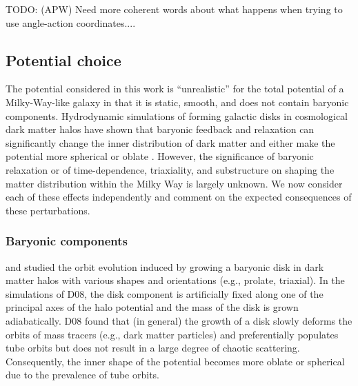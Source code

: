 \documentclass[letterpaper,12pt,preprint]{aastex}
\newcommand{\todo}[2]{{\color{red} TODO: (\MakeUppercase{#1}) #2}}
\begin{document}
\todo{apw}{Need more coherent words about what happens when trying to use angle-action coordinates...}.

\subsection{Potential choice}

The potential considered in this work is ``unrealistic'' for the total potential of a Milky-Way-like galaxy in that it is static, smooth, and does not contain baryonic components. Hydrodynamic simulations of forming galactic disks in cosmological dark matter halos have shown that baryonic feedback and relaxation can significantly change the inner distribution of dark matter and either make the potential more spherical or oblate \citep{many}. However, the significance of baryonic relaxation or of time-dependence, triaxiality, and substructure on shaping the matter distribution within the Milky Way is largely unknown. We now consider each of these effects independently and comment on the expected consequences of these perturbations.

\subsubsection{Baryonic components}

\cite[][D08]{debattista08} and \cite[][V10]{valluri10} studied the orbit evolution induced by growing a baryonic disk in dark matter halos with various shapes and orientations (e.g., prolate, triaxial). In the simulations of D08, the disk component is artificially fixed along one of the principal axes of the halo potential and the mass of the disk is grown adiabatically. D08 found that (in general) the growth of a disk slowly deforms the orbits of mass tracers (e.g., dark matter particles) and preferentially populates tube orbits but does not result in a large degree of chaotic scattering. Consequently, the inner shape of the potential becomes more oblate or spherical due to the prevalence of tube orbits. 
\end{document}
